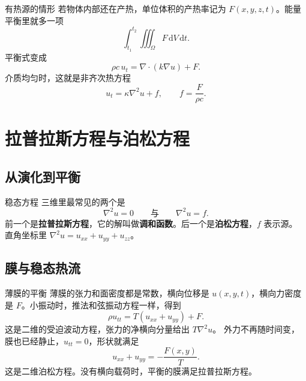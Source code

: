 \documentclass[fontset=windows, chinese, 10pt, xcolor=dvipsnames]{beamer}
\begin{document}
\begin{frame}{有热源的情形}
  若物体内部还在产热，单位体积的产热率记为 $F(x,y,z,t)$。能量平衡里就多一项
  \begin{equation*}
    \int_{t_1}^{t_2}\iiint_{\Omega} F\,\mathrm{d}V\,\mathrm{d}t.
  \end{equation*}
  平衡式变成
  \begin{equation*}
    \rho c\,u_t=\nabla\cdot(k\nabla u)+F.
  \end{equation*}
  介质均匀时，这就是非齐次热方程
  \begin{equation*}
    \boxed{u_t=\kappa\nabla^2u+f,\qquad f=\frac{F}{\rho c}.}
  \end{equation*}
\end{frame}

\section{拉普拉斯方程与泊松方程}

\subsection{从演化到平衡}

\begin{frame}{稳态方程}
 三维里最常见的两个是
  \begin{equation*}
    \boxed{\nabla^2u=0}
    \qquad\text{与}\qquad
    \boxed{\nabla^2u=f.}
  \end{equation*}
  前一个是\textbf{拉普拉斯方程}，它的解叫做\textbf{调和函数}。后一个是\textbf{泊松方程}，$f$ 表示源。
  直角坐标里 $\nabla^2u=u_{xx}+u_{yy}+u_{zz}$。
\end{frame}


\subsection{膜与稳态热流}

\begin{frame}{薄膜的平衡}
  薄膜的张力和面密度都是常数，横向位移是 $u(x,y,t)$，横向力密度是 $F$。小振动时，推法和弦振动方程一样，得到
  \begin{equation*}
    \rho u_{tt}=T(u_{xx}+u_{yy})+F.
  \end{equation*}
  这是二维的受迫波动方程，张力的净横向分量给出 $T\nabla^2 u$。
  \vspace{0.35em}
  外力不再随时间变，膜也已经静止，$u_{tt}=0$，形状就满足
  \begin{equation*}
    u_{xx}+u_{yy}=-\frac{F(x,y)}{T}.
  \end{equation*}
  这是二维泊松方程。没有横向载荷时，平衡的膜满足拉普拉斯方程。
\end{frame}
\end{document}
